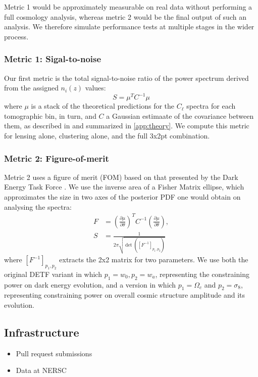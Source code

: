 \documentclass[twocolumn,twocolappendix]{aastex63}
\begin{document}
Metric 1 would be approximately measurable on real data without performing a full cosmology analysis,
whereas metric 2 would be the final output of such an analysis.  We therefore simulate performance
tests at multiple stages in the wider process.


\subsubsection{Metric 1: Sigal-to-noise}
Our first metric is the total signal-to-noise ratio of the power spectrum derived from the assigned
$n_i(z)$ values:
\begin{equation}
    S = \mu^{T} C^{-1} \mu
\label{eq:snr}
\end{equation}
where $\mu$ is a stack of the theoretical predictions for the $C_\ell$ spectra for each tomographic 
bin, in turn, and $C$ a Gaussian estimaate of the covariance between them, as described in
\citet{wl-review} and summarized in \autoref{app:theory}.   We compute this metric for lensing alone, clustering alone, and the full 3x2pt combination.

\subsubsection{Metric 2: Figure-of-merit}

Metric 2 uses a figure of merit (FOM) based on that presented by the Dark Energy Task Force \citep{detf}.  We 
use the inverse area of a Fisher Matrix ellipse, which approximates the size in two axes 
of the posterior PDF one would obtain on analysing the spectra:
\begin{align}
    F &= \left( \frac{\partial \mu}{\partial \theta} \right)^T C^{-1} \left( \frac{\partial \mu}{\partial \theta} \right), \\
    S &= \frac{1}{2 \pi \sqrt{\det{([F^{-1}]_{p_1, p_2})}}}
\label{eq:fom}
\end{align}
where $[F^{-1}]_{p_1, p_2}$ extracts the 2x2 matrix for two parameters.  We use both the original
DETF variant in which $p_1 = w_0, p_2 = w_a$, representing the constraining power on dark energy 
evolution, and a version in which $p_1 = \Omega_c$ and $p_2 = \sigma_8$, representing constraining
power on overall cosmic structure amplitude and its evolution.




\subsection{Infrastructure}
\begin{itemize}
    \item Pull request submissions
    \item Data at NERSC
\end{itemize}
\end{document}
